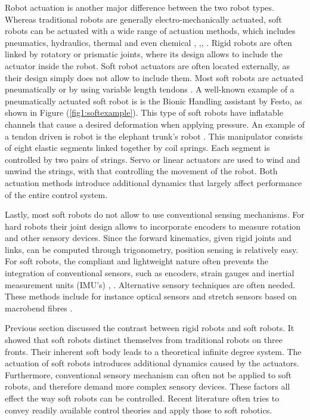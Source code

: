 Robot actuation is another major difference between the two robot types.
Whereas traditional robots are generally electro-mechanically actuated, soft robots can be actuated with a wide range of actuation methods, which includes pneumatics, hydraulics, thermal and even chemical \cite{BHA}, \cite{marchese2014},\cite{kang2019programmable}, \cite{shepherd2013using}. Rigid robots are often linked by rotatory or prismatic joints, where its design allows to include the actuator inside the robot. Soft robot actuators are often located externally, as their design simply does not allow to include them. Most soft robots are actuated pneumatically or by using variable length tendons \cite{Rus2015}. A well-known example of a pneumatically actuated soft robot is is the Bionic Handling assistant by Festo, as shown in Figure (\ref{fig1:softexample}). This type of soft robots have inflatable channels that cause a desired deformation when applying pressure. An example of a tendon driven is robot is the elephant trunk's robot \cite{cieslak1999elephant}. This manipulator consists of eight elastic segments linked together by coil springs. Each segment is controlled by two pairs of strings. Servo or linear actuators are used to wind and unwind the strings, with that controlling the movement of the robot. Both actuation methods introduce additional dynamics that largely affect performance of the entire control system. 

Lastly, most soft robots do not allow to use conventional sensing mechanisms. For hard robots their joint design allows to incorporate encoders to measure rotation and other sensory devices. Since the forward kinematics, given rigid joints and links, can be computed through trigonometry, position sensing is relatively easy. For soft robots, the compliant and lightweight nature often prevents the integration of conventional sensors, such as encoders, strain gauges and inertial measurement units (IMU's) \cite{Rus2015}, \cite{Lee2017}. Alternative sensory techniques are often needed. These methods include for instance optical sensors and stretch sensors based on macrobend fibres \cite{Sareh2015}.


Previous section discussed the contrast between rigid robots and soft robots. It showed that soft robots distinct themselves from traditional robots on three fronts. Their inherent soft body leads to a theoretical infinite degree system. The actuation of soft robots introduces additional dynamics caused by the actuators. Furthermore, conventional sensory mechanism can often not be applied to soft robots, and therefore demand more complex sensory devices. These factors all effect the way soft robots can be controlled. Recent literature often tries to convey readily available control theories and apply those to soft robotics.

